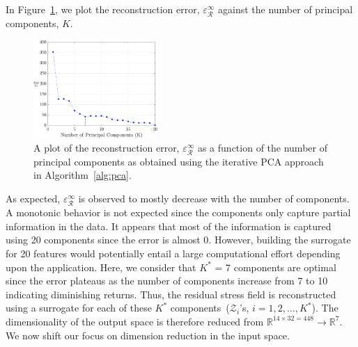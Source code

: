 In Figure~\ref{fig:pca}, we plot the reconstruction error, $\varepsilon_\mathcal{R}^\infty$ against the number of
principal components, $K$. 
%
\begin{figure}[htbp]
\begin{center}
\includegraphics[width=0.42\textwidth]{./Figures/error_PCA}
\end{center}
\caption{A plot of the reconstruction error, $\varepsilon_\mathcal{R}^\infty$ as a function of the
number of principal components as obtained using the iterative PCA approach in Algorithm~\ref{alg:pca}.}
\label{fig:pca}
\end{figure}
%
As expected, $\varepsilon_\mathcal{R}^\infty$ is observed to mostly decrease with the number of components. 
A monotonic behavior is not expected since the components only capture partial information in the data. It 
appears that most of the information is captured using 20 components since the error is almost 0. However,
building the surrogate for 20 features would potentially entail a large computational effort depending upon the
application. Here, we consider that $K^\ast$ = 7 components are optimal since the error plateaus as the number of
components increase from 7 to 10 indicating diminishing returns. Thus, the residual stress field is reconstructed
using a surrogate for each of these $K^\ast$ components~($\mathcal{Z}_i$'s, $i = 1,2,\ldots,K^\ast$).
The dimensionality of the output space is therefore reduced 
from $\mathbb{R}^{14\times 32=448}\rightarrow \mathbb{R}^7$. We now shift our focus on dimension reduction
in the input space.

